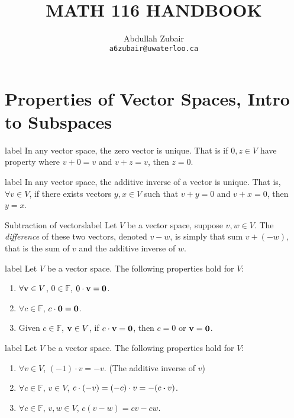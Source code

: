 \documentclass[12pt]{article}
\title{ \normalsize \textsc{}   %
      \\[2.0cm]               %
      \HRule{0.5pt} \\            %
      \LARGE \textbf{\uppercase{Math 116 Handbook}} %
      \HRule{2pt} \\ [0.5cm]    %
      \normalsize     %
    }
\author{
    Abdullah Zubair\\
        \texttt{a6zubair@uwaterloo.ca} \\
}
\theoremstyle{definition}
\newcommand{\F}{\ensuremath{\mathbb{F}}}
\begin{document}
\setcounter{section}{1}
\section{Properties of Vector Spaces, Intro to Subspaces}
\begin{theorem}{}{label}
    In any vector space, the zero vector is unique. That is if $0,z \in V$ have property where $v + 0 = v$ and $v + z = v$, then $z = 0$.
\end{theorem}
\begin{theorem}{}{label}
    In any vector space, the additive inverse of a vector is unique. That is, $\forall v\in V$, if there exists vectors $y,x\in V$ such that $v + y = 0$ and $v + x = 0$, then $y = x$.
\end{theorem}
\begin{definition}{Subtraction of vectors}{label}
   Let $V$ be a vector space, suppose $v,w\in V$. The \emph{difference} of these two vectors, denoted $v - w$, is simply that sum $v + (-w)$, that is the sum of $v$ and the additive inverse of $w$.
\end{definition}
\begin{lemma}{}{label}
   Let $V$ be a vector space. The following properties hold for $V$:
   \begin{enumerate}
       \item $\forall \vb v\in V$, $0\in \F$, $0\cdot \vb v = \vb 0$. 
       \item $\forall c\in \F$, $c \cdot \vb 0 = \vb 0$.
       \item Given $c\in \F$, $\vb v\in V$, if $c\cdot \vb v = \vb 0$, then $c = 0$ or $\vb v = \vb 0$.
   \end{enumerate}
\end{lemma}
\begin{lemma}{}{label}
   Let $V$ be a vector space. The following properties hold for $V$:
   \begin{enumerate}
       \item $\forall v\in V$, $(-1)\cdot v = -v$. (The additive inverse of $v$)
       \item $\forall c\in \F$, $v\in V$, $c\cdot (-v) = (-c) \cdot v = -(c\vdot v)$.
       \item $\forall c\in \F$, $v,w\in V$, $c(v - w) = cv - cw$.
   \end{enumerate}

\end{lemma}
\end{document}
